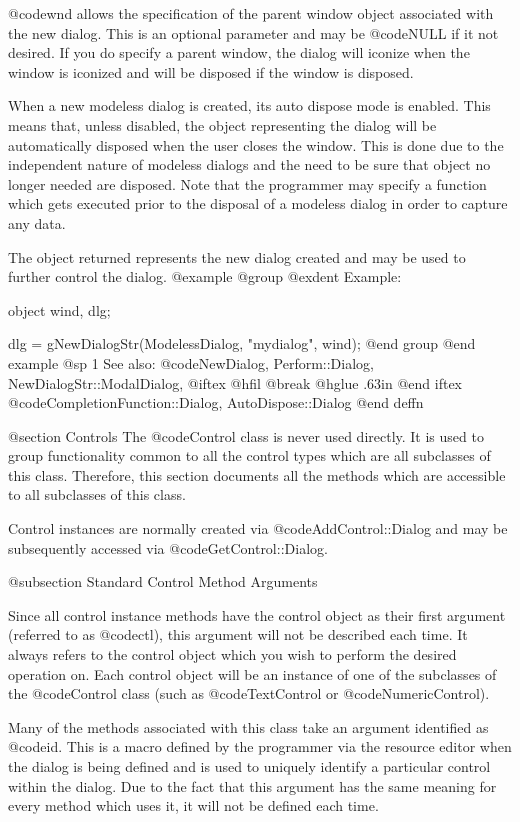 @code{wnd} allows the specification of the parent window object associated
with the new dialog.  This is an optional parameter and may be @code{NULL}
if it not desired.  If you do specify a parent window, the dialog will
iconize when the window is iconized and will be disposed if the window
is disposed.

When a new modeless dialog is created, its auto dispose mode is enabled.
This means that, unless disabled, the object representing the dialog
will be automatically disposed when the user closes the window.  This
is done due to the independent nature of modeless dialogs and the need
to be sure that object no longer needed are disposed.  Note that the
programmer may specify a function which gets executed prior to the
disposal of a modeless dialog in order to capture any data.

The object returned represents the new dialog created and may be
used to further control the dialog.
@example
@group
@exdent Example:

object  wind, dlg;

dlg = gNewDialogStr(ModelessDialog, "mydialog", wind);
@end group
@end example
@sp 1
See also:  @code{NewDialog, Perform::Dialog, NewDialogStr::ModalDialog,}
@iftex
@hfil @break @hglue .63in 
@end iftex
@code{CompletionFunction::Dialog, AutoDispose::Dialog}
@end deffn






@section Controls
The @code{Control} class is never used directly.  It is used to group
functionality common to all the control types which are all subclasses
of this class.  Therefore, this section documents all the methods which
are accessible to all subclasses of this class.


Control instances are normally created via @code{AddControl::Dialog}
and may be subsequently accessed via @code{GetControl::Dialog}.



@subsection  Standard Control Method Arguments

Since all control instance methods have the control object as their
first argument (referred to as @code{ctl}), this argument will not be
described each time.  It always refers to the control object which you
wish to perform the desired operation on.  Each control object will be
an instance of one of the subclasses of the @code{Control} class (such
as @code{TextControl} or @code{NumericControl}).


Many of the methods associated with this class take an argument
identified as @code{id}.  This is a macro defined by the programmer via
the resource editor when the dialog is being defined and is used to
uniquely identify a particular control within the dialog.  Due to the
fact that this argument has the same meaning for every method which
uses it, it will not be defined each time.


